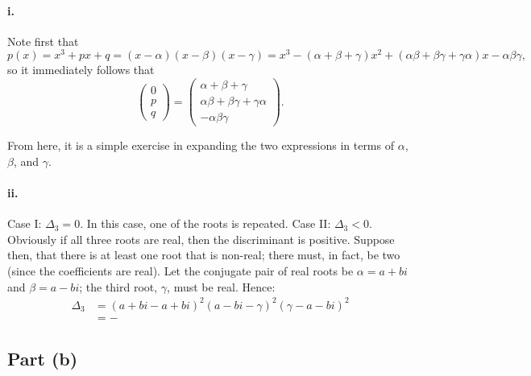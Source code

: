 \documentclass[a4paper]{report}
\begin{document}
\paragraph{i.}
Note first that
\begin{displaymath}
  p(x) = x^3 + px + q = (x - \alpha)(x - \beta)(x - \gamma) = x^3 - (\alpha + \beta + \gamma)x^2 + (\alpha\beta + \beta\gamma + \gamma\alpha)x - \alpha\beta\gamma,
\end{displaymath}
so it immediately follows that
\begin{displaymath}
  \begin{pmatrix} 0 \\ p \\ q
  \end{pmatrix} =
  \begin{pmatrix}
    \alpha + \beta + \gamma\\
    \alpha\beta + \beta\gamma + \gamma\alpha\\
    - \alpha\beta\gamma
  \end{pmatrix}.
\end{displaymath}

From here, it is a simple exercise in expanding the two expressions in terms of $ \alpha $, $ \beta $, and $ \gamma $.

\paragraph{ii.}
Case I: $ \Delta_3 = 0 $. In this case, one of the roots is repeated.
Case II: $ \Delta_3 < 0 $. Obviously if all three roots are real, then the discriminant is positive. Suppose then, that there
is at least one root that is non-real; there must, in fact, be two (since the coefficients are real). Let the conjugate
pair of real roots be $ \alpha = a + bi $ and $ \beta = a - bi $; the third root, $ \gamma $, must be real. Hence:
\begin{align*}
  \Delta_3 &= (a + bi - a + bi)^2 (a - bi - \gamma)^2 (\gamma - a - bi)^2\\
           &= -
\end{align*}

\subsection*{Part (b)}
\end{document}
